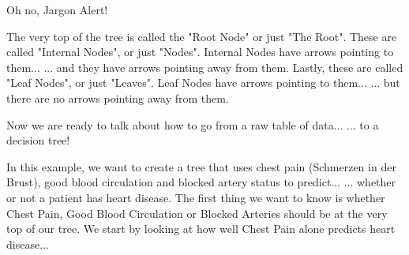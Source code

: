 \documentclass[
	final,
	a4paper,
	oneside,
	parskip=full,
	headings=standardclasses,
	headings=big,
	pointednumbers
]{scrartcl}
\begin{document}
        Oh no, Jargon Alert!
        
        The very top of the tree is called the "Root Node" or just "The Root".
        These are called "Internal Nodes", or just "Nodes".
        Internal Nodes have arrows pointing to them...
        ... and they have arrows pointing away from them.
        Lastly, these are called "Leaf Nodes", or just "Leaves".
        Leaf Nodes have arrows pointing to them...
        ... but there are no arrows pointing away from them.
        
        Now we are ready to talk about how to go from a raw table of data...
        ... to a decision tree!
        
        In this example, we want to create a tree that uses chest pain (Schmerzen in der Brust),
        good blood circulation and blocked artery status to predict...
        ... whether or not a patient has heart disease.
        The first thing we want to know is whether Chest Pain,
        Good Blood Circulation or Blocked Arteries should be at the
        very top of our tree.
        We start by looking at how well Chest Pain alone predicts heart disease...
        
\end{document}

